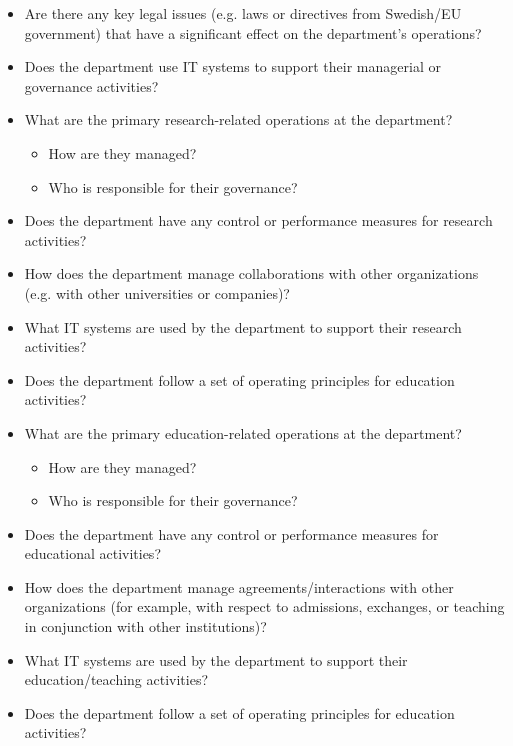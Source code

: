 \begin{itemize}
\item Are there any key legal issues (e.g. laws or directives from Swedish/EU government) that have a significant effect on the department’s operations?
\item Does the department use IT systems to support their managerial or governance activities?
\item What are the primary research-related operations at the department? 
	\begin{itemize}
	  \item How are they managed?
  	\item Who is responsible for their governance?
  \end{itemize}
\item Does the department have any control or performance measures for research activities?
\item How does the department manage collaborations with other organizations (e.g. with other universities or companies)?
\item What IT systems are used by the department to support their research activities?
\item Does the department follow a set of operating principles for education activities?
\item What are the primary education-related operations at the department?
  \begin{itemize}
	  \item How are they managed?
	  \item Who is responsible for their governance?
	\end{itemize}
\item Does the department have any control or performance measures for educational activities?
\item How does the department manage agreements/interactions with other organizations (for example, with respect to admissions, exchanges, or teaching in conjunction with other institutions)?
\item What IT systems are used by the department to support their education/teaching activities?
\item Does the department follow a set of operating principles for education activities?
\end{itemize}

